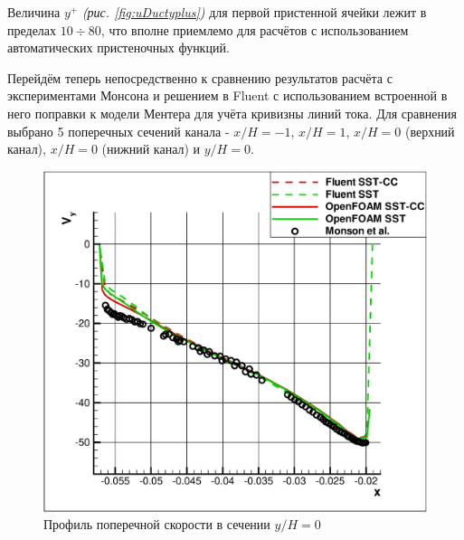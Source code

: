 Величина $y^{+}$ \textit{(рис. \ref{fig:uDuctyplus})} для первой пристенной ячейки лежит в пределах $10 \div 80$, что вполне приемлемо для расчётов с использованием автоматических пристеночных функций.

Перейдём теперь непосредственно к сравнению результатов расчёта с экспериментами Монсона и решением в Fluent с использованием встроенной в него поправки к модели Ментера для учёта кривизны линий тока. Для сравнения выбрано 5 поперечных сечений канала - $x/H=-1$, $x/H = 1$, $x/H = 0$ (верхний канал), $x/H = 0$ (нижний канал) и $y/H=0$.
\begin{figure}[h]
	\centering
	\includegraphics[scale=0.55]{yh0}
	\caption{Профиль поперечной скорости в сечении $y/H=0$}
	\label{fig:y0}
\end{figure}
